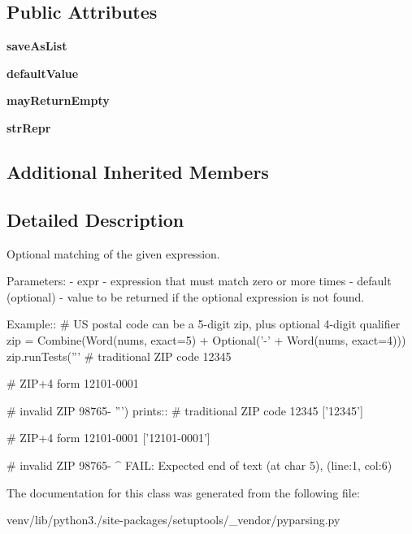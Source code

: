 \subsection*{Public Attributes}
\begin{DoxyCompactItemize}
\item 
\mbox{\label{classsetuptools_1_1__vendor_1_1pyparsing_1_1_optional_a2f7baad9ccdd255c84df1695c609f4dd}} 
{\bfseries save\+As\+List}
\item 
\mbox{\label{classsetuptools_1_1__vendor_1_1pyparsing_1_1_optional_a1337c761fd9525eca71a94dfaec01114}} 
{\bfseries default\+Value}
\item 
\mbox{\label{classsetuptools_1_1__vendor_1_1pyparsing_1_1_optional_a595698691fa87a858c9e0b7a52f65a9c}} 
{\bfseries may\+Return\+Empty}
\item 
\mbox{\label{classsetuptools_1_1__vendor_1_1pyparsing_1_1_optional_a4ece373bbdc974de87c5bf0bbcc8c811}} 
{\bfseries str\+Repr}
\end{DoxyCompactItemize}
\subsection*{Additional Inherited Members}


\subsection{Detailed Description}
\begin{DoxyVerb}Optional matching of the given expression.

Parameters:
 - expr - expression that must match zero or more times
 - default (optional) - value to be returned if the optional expression is not found.

Example::
    # US postal code can be a 5-digit zip, plus optional 4-digit qualifier
    zip = Combine(Word(nums, exact=5) + Optional('-' + Word(nums, exact=4)))
    zip.runTests('''
        # traditional ZIP code
        12345
        
        # ZIP+4 form
        12101-0001
        
        # invalid ZIP
        98765-
        ''')
prints::
    # traditional ZIP code
    12345
    ['12345']

    # ZIP+4 form
    12101-0001
    ['12101-0001']

    # invalid ZIP
    98765-
         ^
    FAIL: Expected end of text (at char 5), (line:1, col:6)
\end{DoxyVerb}
 

The documentation for this class was generated from the following file\+:\begin{DoxyCompactItemize}
\item 
venv/lib/python3./site-\/packages/setuptools/\+\_\+vendor/pyparsing.\+py\end{DoxyCompactItemize}
